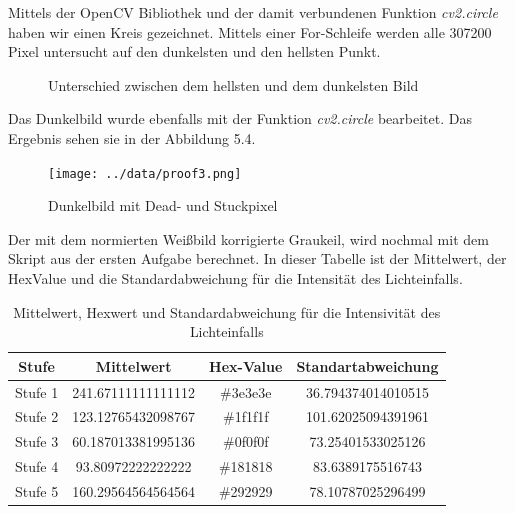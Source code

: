 \documentclass[12pt, oneside, a4paper, \docLanguage]{report}
\begin{document}
Mittels der OpenCV Bibliothek und der damit verbundenen Funktion \textit{cv2.circle} haben wir einen Kreis gezeichnet.
Mittels einer For-Schleife werden alle 307200 Pixel untersucht auf den dunkelsten und den hellsten Punkt. 
\begin{figure}[hbt!]
  	\centering
	\hfill
	\caption{Unterschied zwischen dem hellsten und dem dunkelsten Bild}
\end{figure}
Das Dunkelbild wurde ebenfalls mit der Funktion \textit{cv2.circle} bearbeitet. Das Ergebnis sehen sie in der Abbildung 5.4.
\begin{figure}[hbt!]
	\centering\small
	\texttt{[image: ../data/proof3.png]}
	\caption{Dunkelbild mit Dead- und Stuckpixel}
	\label{fig:Dunkelbild mit Dead- und Stuckpixel}
\end{figure}
\newpage
Der mit dem normierten Weißbild korrigierte Graukeil, wird nochmal mit dem Skript aus der ersten Aufgabe berechnet.
In dieser Tabelle ist der Mittelwert, der HexValue und die Standardabweichung für die Intensität des Lichteinfalls.
\begin{table}[H]
	\centering\small
	\begin{tabular}{|c|c|c|c|}
	\hline
	Stufe & Mittelwert & Hex-Value & Standartabweichung \\
	\hline
	Stufe 1 & 241.67111111111112 & \#3e3e3e & 36.794374014010515 \\
	\hline
	Stufe 2 & 123.12765432098767 & \#1f1f1f & 101.62025094391961 \\
	\hline
	Stufe 3 & 60.187013381995136 & \#0f0f0f & 73.25401533025126 \\
	\hline
	Stufe 4 & 93.80972222222222 & \#181818 & 83.6389175516743 \\
	\hline
	Stufe 5 & 160.29564564564564 & \#292929 & 78.10787025296499 \\
	\hline
	\end{tabular}
	\caption{Mittelwert, Hexwert und Standardabweichung für die Intensivität des Lichteinfalls}
	\label{fig:VERSUCH_4_MESSWERTE}
\end{table}

\newpage
\end{document}

